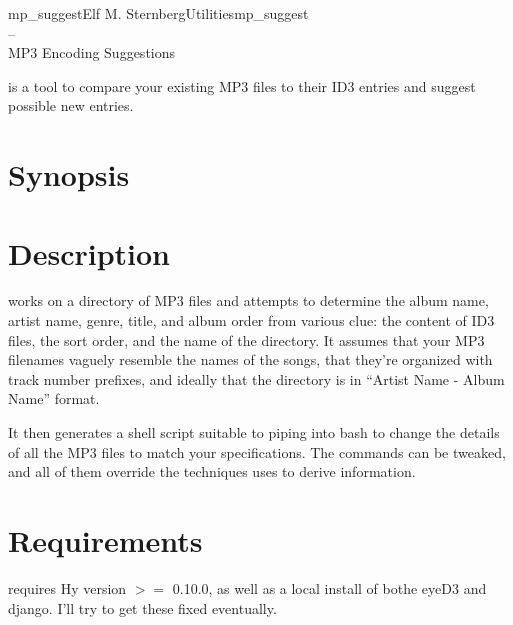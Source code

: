 \documentclass[english]{article}
\begin{document}
\begin{Name}{1}{mp\_suggest}{Elf M. Sternberg}{Utilities}{mp\_suggest \\--\\ MP3 Encoding Suggestions}

   is a tool to compare your existing MP3 files to
  their ID3 entries and suggest possible new entries.

\end{Name}

\section{Synopsis}

 

\section{Description}

 works on a directory of MP3 files and attempts to
determine the album name, artist name, genre, title, and album order
from various clue: the content of ID3 files, the sort order, and the
name of the directory.  It assumes that your MP3 filenames vaguely
resemble the names of the songs, that they're organized with track
number prefixes, and ideally that the directory is in ``Artist Name -
Album Name'' format.

It then generates a shell script suitable to piping into bash to change
the details of all the MP3 files to match your specifications.  The
commands can be tweaked, and all of them override the techniques
 uses to derive information.

\section{Requirements}

\begin{description}\setlength{\itemsep}{1cm}
\item[Hy]  requires Hy version $>=$ 0.10.0, as well as
  a local install of bothe eyeD3 and django.  I'll try to get these
  fixed eventually.

\end{description}
\end{document}
